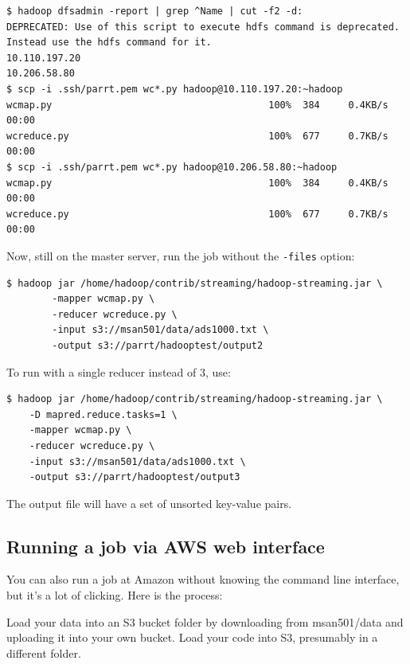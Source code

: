 \begin{fullwidth}
\begin{lstlisting}[style=BashInputStyle]
$ hadoop dfsadmin -report | grep ^Name | cut -f2 -d:
DEPRECATED: Use of this script to execute hdfs command is deprecated.
Instead use the hdfs command for it.
10.110.197.20
10.206.58.80
$ scp -i .ssh/parrt.pem wc*.py hadoop@10.110.197.20:~hadoop
wcmap.py                                      100%  384     0.4KB/s   00:00    
wcreduce.py                                   100%  677     0.7KB/s   00:00    
$ scp -i .ssh/parrt.pem wc*.py hadoop@10.206.58.80:~hadoop
wcmap.py                                      100%  384     0.4KB/s   00:00    
wcreduce.py                                   100%  677     0.7KB/s   00:00    
\end{lstlisting}

\noindent Now, still on the master server, run the job without the {\tt -files} option:

\begin{lstlisting}[style=BashInputStyle]
$ hadoop jar /home/hadoop/contrib/streaming/hadoop-streaming.jar \
    	-mapper wcmap.py \
    	-reducer wcreduce.py \
    	-input s3://msan501/data/ads1000.txt \
    	-output s3://parrt/hadooptest/output2
\end{lstlisting}

\noindent To run with a single reducer instead of 3, use:

\begin{lstlisting}[style=BashInputStyle]
$ hadoop jar /home/hadoop/contrib/streaming/hadoop-streaming.jar \
    -D mapred.reduce.tasks=1 \
    -mapper wcmap.py \
    -reducer wcreduce.py \
    -input s3://msan501/data/ads1000.txt \
    -output s3://parrt/hadooptest/output3
\end{lstlisting}

 The output file will have a set of unsorted key-value pairs.

\subsection{Running a job via AWS web interface}

You can also run a job at Amazon without knowing the command line interface, but it's a lot of clicking. Here is the process:

\step Load your data into an S3 bucket folder by downloading from msan501/data and uploading it into your own bucket. Load your code into S3, presumably in a different folder.


\end{fullwidth}
